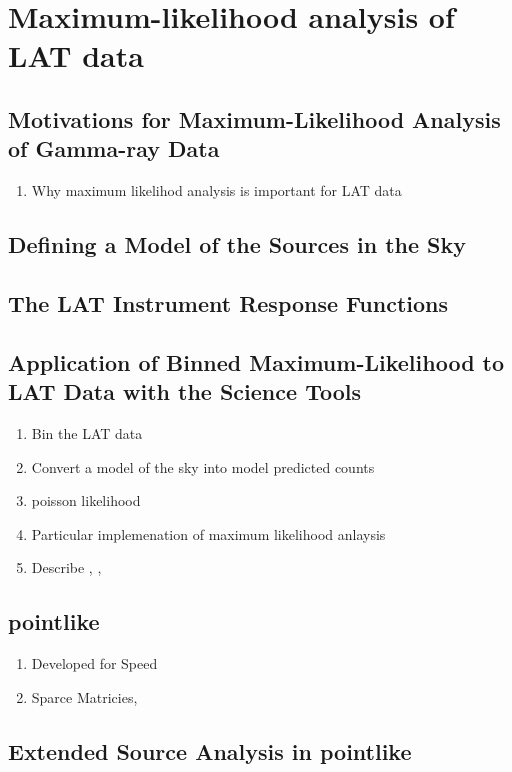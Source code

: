 \chapter{Maximum-likelihood analysis of LAT data}

\section{Motivations for Maximum-Likelihood Analysis of Gamma-ray Data}

\begin{enumerate}
  \item Why maximum likelihod analysis is important for LAT data
\end{enumerate}

\section{Defining a Model of the Sources in the Sky}

\section{The LAT Instrument Response Functions}

\section{Application of Binned Maximum-Likelihood to LAT Data with the Science Tools}

\begin{enumerate}
  \item Bin the LAT data
  \item Convert a model of the sky into model predicted counts
  \item poisson likelihood
  \item Particular implemenation of maximum likelihood anlaysis
  \item Describe \gtbin, \gtselect, \gtlike
\end{enumerate}




\section{pointlike}

\begin{enumerate}
\item Developed for Speed
\item Sparce Matricies, 
\end{enumerate}

\section{Extended Source Analysis in pointlike}
